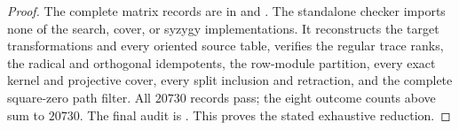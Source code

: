 \begin{proof}
The complete matrix records are in
 and
.
The standalone checker
imports none of the search, cover, or syzygy implementations.
It reconstructs the target transformations and every oriented
source table, verifies the regular trace ranks, the radical and
orthogonal idempotents, the row-module partition, every exact
kernel and projective cover, every split inclusion and retraction,
and the complete square-zero path filter.  All $20730$ records
pass; the eight outcome counts above sum to $20730$.
The final audit is
.
This proves the stated exhaustive reduction.
\end{proof}
